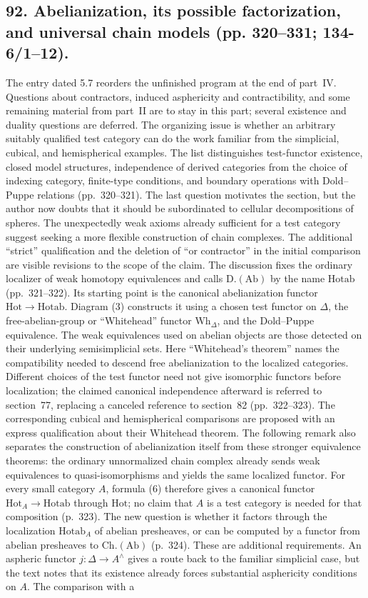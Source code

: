 \documentclass[10pt,oneside]{book}
\begin{document}
\subsection*{92. Abelianization, its possible factorization, and universal chain models (pp. 320--331; 134-6/1--12).}
The entry dated 5.7 reorders the unfinished program at the end of part~IV. Questions about contractors, induced asphericity and contractibility, and some remaining material from part~II are to stay in this part; several existence and duality questions are deferred. The organizing issue is whether an arbitrary suitably qualified test category can do the work familiar from the simplicial, cubical, and hemispherical examples. The list distinguishes test-functor existence, closed model structures, independence of derived categories from the choice of indexing category, finite-type conditions, and boundary operations with Dold--Puppe relations (pp.~320--321). The last question motivates the section, but the author now doubts that it should be subordinated to cellular decompositions of spheres. The unexpectedly weak axioms already sufficient for a test category suggest seeking a more flexible construction of chain complexes. The additional ``strict'' qualification and the deletion of ``or contractor'' in the initial comparison are visible revisions to the scope of the claim. The discussion fixes the ordinary localizer of weak homotopy equivalences and calls $\mathrm{D.}(\mathrm{Ab})$ by the name $\mathrm{Hotab}$ (pp.~321--322). Its starting point is the canonical abelianization functor $\mathrm{Hot}\to\mathrm{Hotab}$. Diagram (3) constructs it using a chosen test functor on $\Delta$, the free-abelian-group or ``Whitehead'' functor $\mathrm{Wh}_{\Delta}$, and the Dold--Puppe equivalence. The weak equivalences used on abelian objects are those detected on their underlying semisimplicial sets. Here ``Whitehead's theorem'' names the compatibility needed to descend free abelianization to the localized categories. Different choices of the test functor need not give isomorphic functors before localization; the claimed canonical independence afterward is referred to section~77, replacing a canceled reference to section~82 (pp.~322--323). The corresponding cubical and hemispherical comparisons are proposed with an express qualification about their Whitehead theorem. The following remark also separates the construction of abelianization itself from these stronger equivalence theorems: the ordinary unnormalized chain complex already sends weak equivalences to quasi-isomorphisms and yields the same localized functor. For every small category $A$, formula (6) therefore gives a canonical functor $\mathrm{Hot}_A\to\mathrm{Hotab}$ through $\mathrm{Hot}$; no claim that $A$ is a test category is needed for that composition (p.~323). The new question is whether it factors through the localization $\mathrm{Hotab}_A$ of abelian presheaves, or can be computed by a functor from abelian presheaves to $\mathrm{Ch.}(\mathrm{Ab})$ (p.~324). These are additional requirements. An aspheric functor $j:\Delta\to A^{\wedge}$ gives a route back to the familiar simplicial case, but the text notes that its existence already forces substantial asphericity conditions on $A$. The comparison with a 
\end{document}
